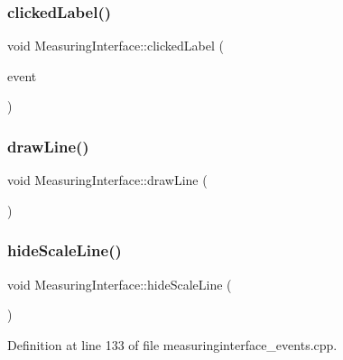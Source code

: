 \subsubsection{\texorpdfstring{clickedLabel()}{clickedLabel()}}
{\footnotesize\ttfamily void Measuring\+Interface\+::clicked\+Label (\begin{DoxyParamCaption}\item[{Q\+Mouse\+Event $\ast$}]{event }\end{DoxyParamCaption})\hspace{0.3cm}{\ttfamily [private]}}

\mbox{\label{classMeasuringInterface_a0a8a206b6c86b0903943ae0646d09ff8}} 
\subsubsection{\texorpdfstring{drawLine()}{drawLine()}}
{\footnotesize\ttfamily void Measuring\+Interface\+::draw\+Line (\begin{DoxyParamCaption}{ }\end{DoxyParamCaption})\hspace{0.3cm}{\ttfamily [private]}}

\mbox{\label{classMeasuringInterface_ad6344a968dacd55de9a7509698442d67}} 
\subsubsection{\texorpdfstring{hideScaleLine()}{hideScaleLine()}}
{\footnotesize\ttfamily void Measuring\+Interface\+::hide\+Scale\+Line (\begin{DoxyParamCaption}{ }\end{DoxyParamCaption})\hspace{0.3cm}{\ttfamily [private]}}



Definition at line 133 of file measuringinterface\+\_\+events.\+cpp.

